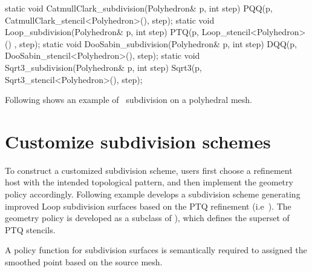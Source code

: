 \begin{ccExampleCode}
  static void CatmullClark_subdivision(Polyhedron& p, int step) {
    PQQ(p, CatmullClark_stencil<Polyhedron>(), step);
  }
  static void Loop_subdivision(Polyhedron& p, int step) {
    PTQ(p, Loop_stencil<Polyhedron>() , step);
  }
  static void DooSabin_subdivision(Polyhedron& p, int step) {
    DQQ(p, DooSabin_stencil<Polyhedron>(), step);
  }
  static void Sqrt3_subdivision(Polyhedron& p, int step) {
    Sqrt3(p, Sqrt3_stencil<Polyhedron>(), step);
  }
\end{ccExampleCode}

Following shows an example of \DS\ subdivision on a polyhedral mesh.

\section{Customize subdivision schemes}
To construct a customized subdivision scheme, users first choose a 
refinement host with the intended topological pattern, and then 
implement the geometry policy accordingly. 
Following example develops a subdivision scheme
generating improved Loop subdivision surfaces based on the PTQ 
refinement (i.e~). 
The geometry policy is developed as a subclass 
of ), which defines the superset of PTQ stencils.

A policy function for subdivision surfaces is semantically
required to assigned the smoothed point based on the source mesh.

